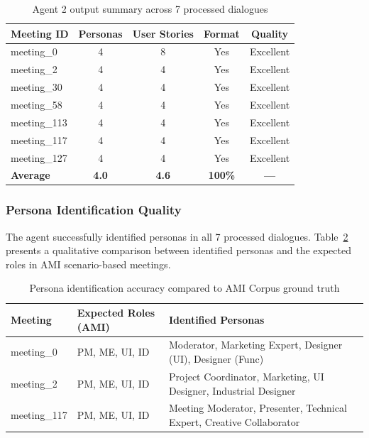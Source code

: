 \documentclass[12pt]{article}
\begin{document}
\begin{table}[htb]
\centering
\caption{Agent 2 output summary across 7 processed dialogues}
\label{tab:agent2_results}
\begin{tabular}{lcccc}
\toprule
\textbf{Meeting ID} & \textbf{Personas} & \textbf{User Stories} & \textbf{Format} & \textbf{Quality} \\
\midrule
meeting\_0   & 4 & 8 & Yes & Excellent \\
meeting\_2   & 4 & 4 & Yes & Excellent \\
meeting\_30  & 4 & 4 & Yes & Excellent \\
meeting\_58  & 4 & 4 & Yes & Excellent \\
meeting\_113 & 4 & 4 & Yes & Excellent \\
meeting\_117 & 4 & 4 & Yes & Excellent \\
meeting\_127 & 4 & 4 & Yes & Excellent \\
\midrule
\textbf{Average} & \textbf{4.0} & \textbf{4.6} & \textbf{100\%} & \textbf{---} \\
\bottomrule
\end{tabular}
\end{table}

\subsubsection{Persona Identification Quality}

The agent successfully identified personas in all 7 processed dialogues. Table~\ref{tab:persona_accuracy} presents a qualitative comparison between identified personas and the expected roles in AMI scenario-based meetings.

\begin{table}[htb]
\centering
\caption{Persona identification accuracy compared to AMI Corpus ground truth}
\label{tab:persona_accuracy}
\begin{tabular}{lp{4cm}p{5cm}}
\toprule
\textbf{Meeting} & \textbf{Expected Roles (AMI)} & \textbf{Identified Personas} \\
\midrule
meeting\_0 & PM, ME, UI, ID & Moderator, Marketing Expert, Designer (UI), Designer (Func) \\
\midrule
meeting\_2 & PM, ME, UI, ID & Project Coordinator, Marketing, UI Designer, Industrial Designer \\
\midrule
meeting\_117 & PM, ME, UI, ID & Meeting Moderator, Presenter, Technical Expert, Creative Collaborator \\
\bottomrule
\end{tabular}
\end{table}
\end{document}
